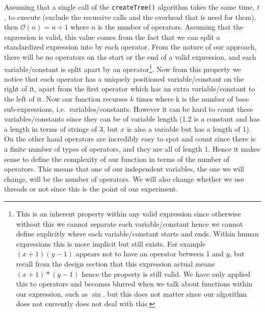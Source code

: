 \documentclass[../../../../../main.tex]{subfiles}
\begin{document}
Assuming that a single call of the \texttt{createTree()} algorithm takes the same time, $t$, to execute (exclude the recursive calls and the overhead that is need for them), then $\mathcal{O}(n) = n+1$ where $n$ is the number of operators. Assuming that the expression is valid, this value comes from the fact that we can split a standardized expression into by each operator. From the nature of our approach, there will be no operators on the start or the end of a valid expression, and each variable/constant is split apart by an operator\footnote{This is an inherent property within any valid expression since otherwise without this we cannot separate each variable/constant hence we cannot define explicitly where each variable/constant starts and ends. Within human expressions this is more implicit but still exists. For example $(x+1)(y-1)$ appears not to have an operator between 1 and $y$, but recall from the design section that this expression actual means $(x+1)*(y-1)$ hence the property is still valid. We have only applied this to operators and becomes blurred when we talk about functions within our expression, such as $\sin$, but this does not matter since our algorithm does not currently does not deal with this.}. 
Now from this property we notice that each operator has a uniquely positioned variable/constant on the right of it, apart from the first operator which has an extra variable/constant to the left of it. Now our function recurses $k$ times where k is the number of base sub-expressions, i.e.\ variables/constants. However it can be hard to count these variables/constants since they can be of variable length (1.2 is a constant and has a length in terms of strings of 3, but $x$ is also a variable but has a length of 1). On the other hand operators are incredibly easy to spot and count since there is a finite number of types of operators, and they are all of length 1. Hence it makes sense to define the complexity of our function in terms of the number of operators. This means that one of our independent variables, the one we will change, will be the number of operators. We will also change whether we use threads or not since this is the point of our experiment.
 
\end{document}
